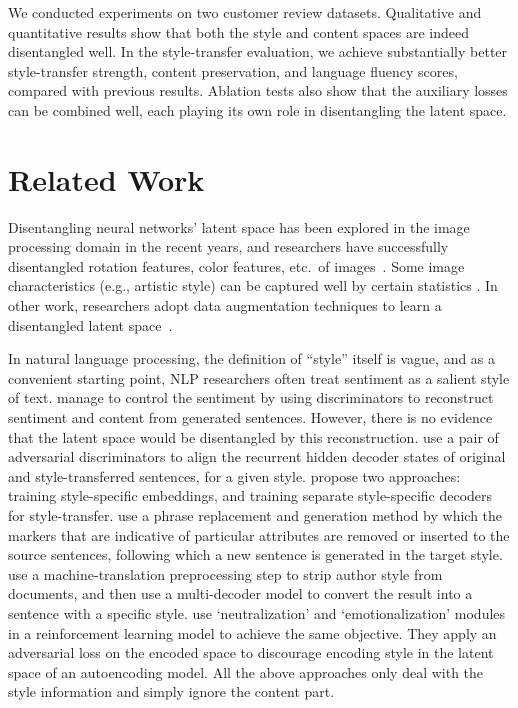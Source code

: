 \documentclass[letterpaper]{article} %
\begin{document}
We conducted experiments on two customer review datasets.
Qualitative and quantitative results show that both the style and content spaces are indeed disentangled well.
In the style-transfer evaluation, we achieve substantially better style-transfer strength, content preservation, and language fluency scores, compared with previous results.
Ablation tests also show that the auxiliary losses can be combined well, each playing its own role in disentangling the latent space.


\section{Related Work}

Disentangling neural networks' latent space has been explored in the image processing domain in the recent years, and researchers have successfully disentangled rotation features, color features, etc.~of images~\cite{chen2016infogan,luan2017deep}.
Some image characteristics (e.g., artistic style) can be captured well by certain statistics \cite{gatys2016image}.
In other work, researchers adopt data augmentation techniques to learn a disentangled latent space~\cite{kulkarni2015deep,champandard2016semantic}.

In natural language processing, the definition of ``style'' itself is vague, and as a convenient starting point, NLP researchers often treat sentiment as a salient style of text.
\citet{hu2017toward} manage to control the sentiment by using discriminators to reconstruct sentiment and content from generated sentences.
However, there is no evidence that the latent space would be disentangled by this reconstruction.
\citet{shen2017style} use a pair of adversarial discriminators to align the recurrent hidden decoder states of original and style-transferred sentences, for a given style.
\citet{fu2018style} propose two approaches: training style-specific embeddings, and training separate style-specific decoders for style-transfer.
\citet{li2018delete} use a phrase replacement and generation method by which the markers that are indicative of particular attributes are removed or inserted to the source sentences, following which a new sentence is generated in the target style.
\citet{prabhumoye2018style} use a machine-translation preprocessing step to strip author style from documents, and then use a multi-decoder model to convert the result into a sentence with a specific style.
\citet{xu2018unpaired} use `neutralization' and `emotionalization' modules in a reinforcement learning model to achieve the same objective.
They apply an adversarial loss on the encoded space to discourage encoding style in the latent space of an autoencoding model. All the above approaches only deal with the style information and simply ignore the content part.
\end{document}

